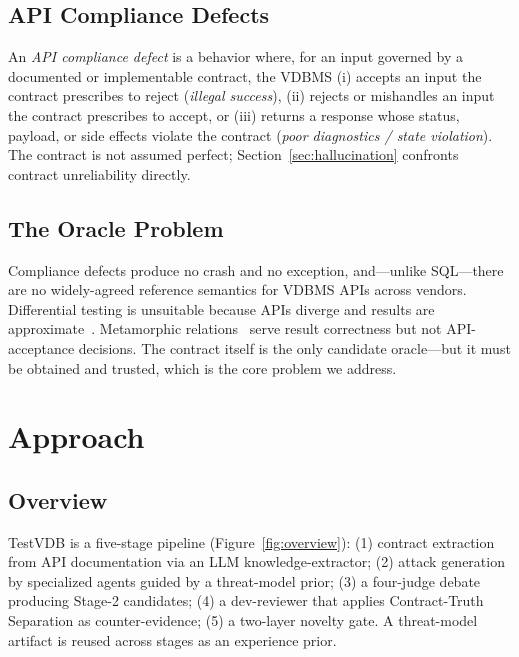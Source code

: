 \documentclass[sigconf]{acmart}
\begin{document}
\subsection{API Compliance Defects}
An \emph{API compliance defect} is a behavior where, for an input governed by a documented or implementable contract, the VDBMS (i) accepts an input the contract prescribes to reject (\emph{illegal success}), (ii) rejects or mishandles an input the contract prescribes to accept, or (iii) returns a response whose status, payload, or side effects violate the contract (\emph{poor diagnostics / state violation}). The contract is not assumed perfect; Section~\ref{sec:hallucination} confronts contract unreliability directly.

\subsection{The Oracle Problem}
Compliance defects produce no crash and no exception, and---unlike SQL---there are no widely-agreed reference semantics for VDBMS APIs across vendors. Differential testing is unsuitable because APIs diverge and results are approximate~\cite{roadmap25}. Metamorphic relations~\cite{metmap24} serve result correctness but not API-acceptance decisions. The contract itself is the only candidate oracle---but it must be obtained and trusted, which is the core problem we address.

\section{Approach}\label{sec:approach}

\subsection{Overview}
TestVDB is a five-stage pipeline (Figure~\ref{fig:overview}): (1) contract extraction from API documentation via an LLM knowledge-extractor; (2) attack generation by specialized agents guided by a threat-model prior; (3) a four-judge debate producing Stage-2 candidates; (4) a dev-reviewer that applies Contract-Truth Separation as counter-evidence; (5) a two-layer novelty gate. A threat-model artifact is reused across stages as an experience prior.
\end{document}
